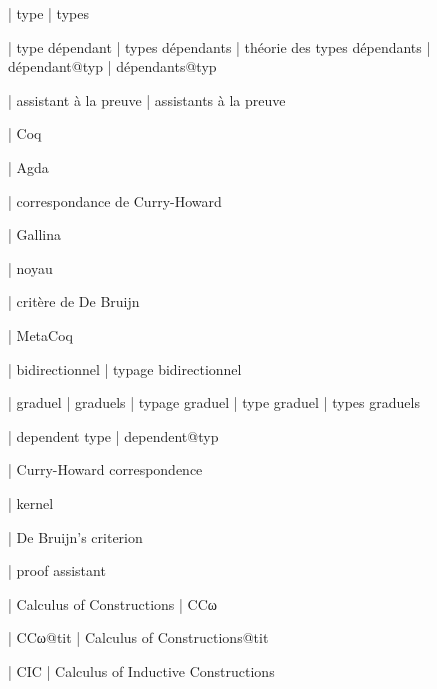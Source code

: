 





  | type
  | types

  | type dépendant
  | types dépendants
  | théorie des types dépendants
  | dépendant@typ
  | dépendants@typ

  | assistant à la preuve
  | assistants à la preuve

  | Coq

  | Agda

  | correspondance de Curry-Howard

  | Gallina

  | noyau

  | critère de De Bruijn

  | MetaCoq

  | bidirectionnel
  | typage bidirectionnel

  | graduel
  | graduels
  | typage graduel
  | type graduel
  | types graduels


  | dependent type
  | dependent@typ

  | Curry-Howard correspondence

  | kernel

  | De Bruijn’s criterion

  | proof assistant


  | Calculus of Constructions
  | CCω

  | CCω@tit
  | Calculus of Constructions@tit

  | CIC
  | Calculus of Inductive Constructions

